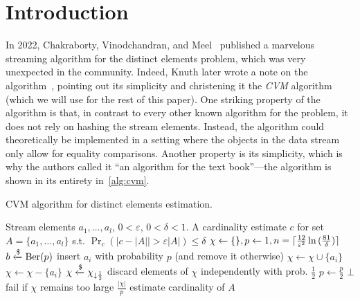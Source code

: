 \section{Introduction}
\label{sec:intro}

In 2022, Chakraborty, Vinodchandran, and Meel~\cite{DBLP:conf/esa/0001VM22} published a marvelous streaming algorithm for the distinct elements problem, which was very unexpected in the community.
Indeed, Knuth later wrote a note on the algorithm~\cite{knuthnote}, pointing out its simplicity and christening it the \emph{CVM} algorithm (which we will use for the rest of this paper).
One striking property of the algorithm is that, in contrast to every other known algorithm for the problem, it does not rely on hashing the stream elements.
Instead, the algorithm could theoretically be implemented in a setting where the objects in the data stream only allow for equality comparisons.
Another property is its simplicity, which is why the authors called it ``an algorithm for the text book''---the algorithm is shown in its entirety in~\cref{alg:cvm}.

\begin{algorithm}[h!]
	\caption{CVM algorithm for distinct elements estimation.}\label{alg:cvm}
	\begin{algorithmic}[1]
  \Require Stream elements $a_1,\dots,a_l$, $0 < \varepsilon$, $0 < \delta < 1$.
  \Ensure A cardinality estimate $c$ for set $A = \{ a_1,\dots,a_l \}$ s.t. $\Pr_c \left( | c - |A| | > \varepsilon |A| \right) \leq \delta$
  \State $\chi \gets \{\}, p \gets 1, n = \lceil\frac{12}{\varepsilon^2} \ln{(\frac{81}{\delta})} \rceil$
    \State $b \xleftarrow{\$} \operatorname{Ber}(p)$ \Comment insert $a_i$ with probability $p$ (and remove it otherwise)
      \State $\chi \gets \chi \cup \{a_i\}$
    \Else
      \State $\chi \gets \chi - \{a_i\}$
    \EndIf
      \State $\chi \xleftarrow{\$} \chi_{\downarrow \frac{1}{2}}$ \Comment discard elements of $\chi$ independently with prob. $\frac{1}{2}$
      \State $p \gets \frac{p}{2}$
    \EndIf
      \Return $\bot$ \Comment fail if $\chi$ remains too large
    \EndIf
  \EndFor
  \Return $\frac{|\chi|}{p}$ \Comment estimate cardinality of $A$
  \end{algorithmic}
\end{algorithm}

